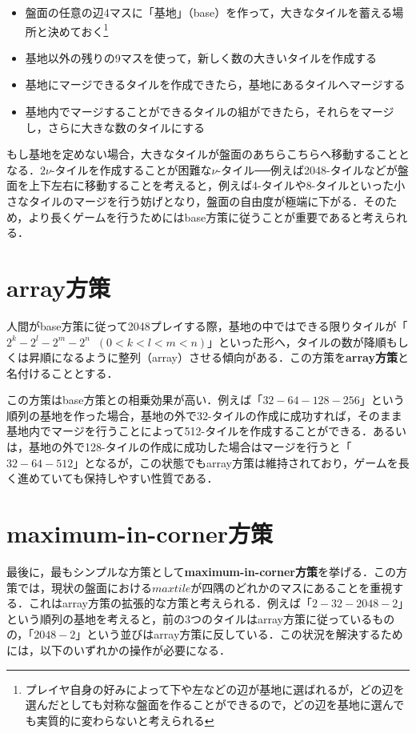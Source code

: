 \documentclass{suribt}
\begin{document}
\begin{itemize}
\item 盤面の任意の辺4マスに「基地」（base）を作って，大きなタイルを蓄える場所と決めておく\footnote{プレイヤ自身の好みによって下や左などの辺が基地に選ばれるが，どの辺を選んだとしても対称な盤面を作ることができるので，どの辺を基地に選んでも実質的に変わらないと考えられる}
\item 基地以外の残りの9マスを使って，新しく数の大きいタイルを作成する
\item 基地にマージできるタイルを作成できたら，基地にあるタイルへマージする
\item 基地内でマージすることができるタイルの組ができたら，それらをマージし，さらに大きな数のタイルにする
\end{itemize}

もし基地を定めない場合，大きなタイルが盤面のあちらこちらへ移動することとなる．$2{\nu}$-タイルを作成することが困難な${\nu}$-タイル──例えば2048-タイルなどが盤面を上下左右に移動することを考えると，例えば4-タイルや8-タイルといった小さなタイルのマージを行う妨げとなり，盤面の自由度が極端に下がる．そのため，より長くゲームを行うためにはbase方策に従うことが重要であると考えられる．

\section{array方策}
人間がbase方策に従って2048プレイする際，基地の中ではできる限りタイルが「$2^{k}-2^{l}-2^{m}-2^{n} \;\; (0<k<l<m<n)$」といった形へ，タイルの数が降順もしくは昇順になるように整列（array）させる傾向がある．この方策を\textbf{array方策}と名付けることとする．

この方策はbase方策との相乗効果が高い．例えば「$32-64-128-256$」という順列の基地を作った場合，基地の外で32-タイルの作成に成功すれば，そのまま基地内でマージを行うことによって512-タイルを作成することができる．あるいは，基地の外で128-タイルの作成に成功した場合はマージを行うと「$32-64-512$」となるが，この状態でもarray方策は維持されており，ゲームを長く進めていても保持しやすい性質である．

\section{maximum-in-corner方策}
最後に，最もシンプルな方策として\textbf{maximum-in-corner方策}を挙げる．この方策では，現状の盤面における$max tile$が四隅のどれかのマスにあることを重視する．これはarray方策の拡張的な方策と考えられる．例えば「$2-32-2048-2$」という順列の基地を考えると，前の3つのタイルはarray方策に従っているものの，「$2048-2$」という並びはarray方策に反している．この状況を解決するためには，以下のいずれかの操作が必要になる．
\end{document}
